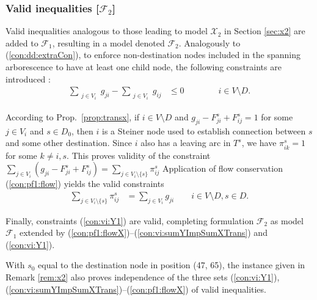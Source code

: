 \subsubsection{Valid inequalities [$\mathcal{F}_2$]}

Valid inequalities analogous to those leading to model $\mathcal{X}_2$ in Section \ref{sec:x2} are added to $\mathcal{F}_1$, resulting in a model denoted $\mathcal{F}_2$.
Analogously to (\ref{con:dd:extraCon}), to enforce non-destination nodes included in the spanning arborescence to have at least one child node,
the following constraints are introduced \citep{Polzin}:
\begin{subequations}[resume]
\begin{flalign}
\label{con:pf1:flowX}  \sum\limits_{\substack{ j\in V_i }}g_{ji}-\sum\limits_{\substack{j\in V_i}}g_{ij}    & \leq 0    \qquad\qquad i\in V\setminus D.
\end{flalign}
\end{subequations}

According to Prop.\ \ref{prop:transx}, if $i\in V\setminus D$ and $g_{ji} - F^s_{ji}+F^s_{ij}=1$ for some $j\in V_i$ and $s\in D_0$,
then $i$ is a Steiner node used to establish connection between $s$ and some other destination.
Since $i$ also has a leaving arc in $T^s$, we have $\pi_{ik}^s=1$ for some $k\neq i,s$.
This proves validity of the constraint $\sum_{j\in V_i}\left(g_{ji} - F^s_{ji}+F^s_{ij}\right)=\sum_{j\in V_i\setminus\{s\}}\pi_{ij}^s$
Application of flow conservation (\ref{con:pf1:flow}) yields the valid constraints
\begin{subequations}[resume]
\begin{flalign}
\label{con:vi:sumYImpSumXTrans} \sum\limits_{j\in V_i\setminus\{s\}}\pi^{s}_{ij} & = \sum\limits_{j\in V_i}  g_{ji}  \quad\quad   i\in V\setminus D, s\in D. 
\end{flalign}
\end{subequations}

\noindent
Finally, constraints (\ref{con:vi:Y1}) are valid,
completing formulation $\mathcal{F}_2$ as model $\mathcal{F}_1$ extended by (\ref{con:pf1:flowX})--(\ref{con:vi:sumYImpSumXTrans}) and (\ref{con:vi:Y1}).
%
\begin{remark} \label{rem:f2}
With $s_0$ equal to the destination node in position (47, 65), the instance given in Remark \ref{rem:x2} also proves independence of the three sets
(\ref{con:vi:Y1}), (\ref{con:vi:sumYImpSumXTrans})--(\ref{con:pf1:flowX}) of valid inequalities.
\end{remark}
